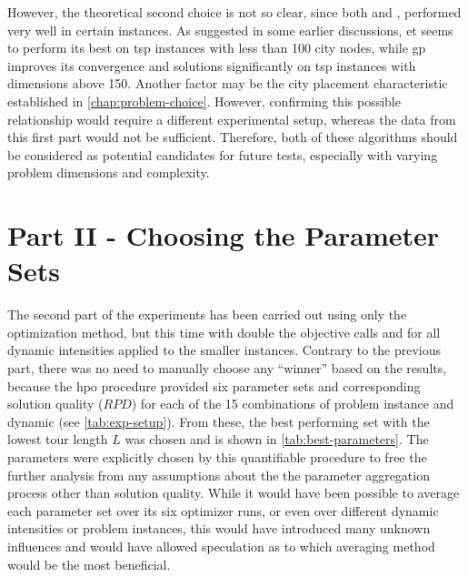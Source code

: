 However, the theoretical second choice is not so clear, since both  and , performed very well in certain instances. As suggested in some earlier discussions, \gls{et} seems to perform its best on \gls{tsp} instances with less than 100 city nodes, while \gls{gp} improves its convergence and solutions significantly on \gls{tsp} instances with dimensions above 150. Another factor may be the city placement characteristic established in \cref{chap:problem-choice}. However, confirming this possible relationship would require a different experimental setup, whereas the data from this first part would not be sufficient. Therefore, both of these algorithms should be considered as potential candidates for future tests, especially with varying problem dimensions and complexity.


\section{Part II - Choosing the Parameter Sets}
\label{chap:part2}

The second part of the experiments has been carried out using only the  optimization method, but this time with double the objective calls and for all dynamic intensities applied to the smaller instances. Contrary to the previous part, there was no need to manually choose any \enquote{winner} based on the results, because the \gls{hpo} procedure provided six parameter sets and corresponding solution quality ($RPD$) for each of the 15 combinations of problem instance and dynamic (see \cref{tab:exp-setup}). From these, the best performing set with the lowest tour length $L$ was chosen and is shown in \cref{tab:best-parameters}. The parameters were explicitly chosen by this quantifiable procedure to free the further analysis from any assumptions about the the parameter aggregation process other than solution quality. While it would have been possible to average each parameter set over its six optimizer runs, or even over different dynamic intensities or problem instances, this would have introduced many unknown influences and would have allowed speculation as to which averaging method would be the most beneficial.

